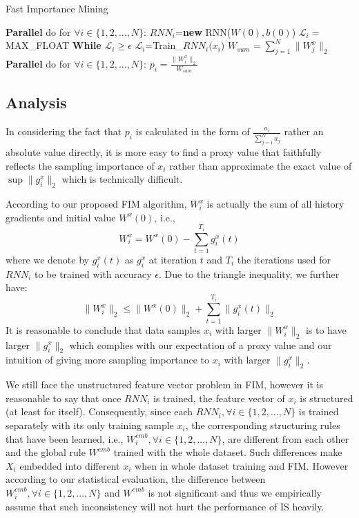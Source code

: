 \documentclass[twoside,leqno,twocolumn]{article}
\begin{document}
\begin{algorithm}[t]
	\caption{Fast Importance Mining}
	\begin{algorithmic}[1]
		\State \textbf{Parallel} do for $\forall i \in \{1,2,...,N\}$:
		\State \qquad $RNN_i$=\textbf{new} RNN($W(0),b(0)$)
		\State \qquad $\mathcal{L}_i =$ MAX\_FLOAT
		\State \qquad \textbf{While} $\mathcal{L}_i\ge \epsilon$
		\State \qquad \qquad $\mathcal{L}_i$=Train\_$RNN_i$$(x_i$)
		\State $W_{sum} = \sum_{j=1}^{N}\|W^x_j\|_2$
		\State \textbf{Parallel} do for $\forall i \in \{1,2,...,N\}$:
		\State \qquad $p_i=\frac{\|W^x_i\|_2}{W_{sum}}$
		\EndProcedure
	\end{algorithmic}
\label{xx}
\end{algorithm}
\subsection{Analysis}
In considering the fact that $p_i$ is calculated in the form of $\frac{a_i}{\sum_{j=1}^{N}a_j}$ rather an absolute value directly, it is more easy to find a proxy value that faithfully reflects the sampling importance of $x_i$ rather than approximate the exact value of $\sup \|g_i^x\|_2$ which is technically difficult. 

According to our proposed FIM algorithm, $W^x_i$ is actually the sum of all history gradients and initial value $W^x(0)$, i.e.,
\begin{equation}
W^x_i=W^x(0)-\sum_{t=1}^{T_i}g_i^x(t)
\end{equation}
where we denote by $g_i^x(t)$ as $g_i^x$ at iteration $t$ and $T_i$ the iterations used for $RNN_i$ to be trained with accuracy $\epsilon$. Due to the triangle inequality, we further have:
\begin{equation}
	\|W^x_i\|_2\le\|W^x(0)\|_2 + \sum_{t=1}^{T_i}\|g_i^x(t)\|_2
\end{equation}
It is reasonable to conclude that data samples $x_i$ with larger $\|W_i^x\|_2$ is to have larger $\|g_i^x\|_2$ which complies with our expectation of a proxy value and our intuition of giving more sampling importance to $x_i$ with larger $\|g_i^x\|_2$. 
 
We still face the unstructured feature vector problem in FIM, however it is reasonable to say that once $RNN_i$ is trained, the feature vector of $x_i$ is structured (at least for itself). Consequently, since each $RNN_i, \forall i \in \{1,2,...,N\}$ is trained separately with its only training sample $x_i$, the corresponding structuring rules that have been learned, i.e., $W^{emb}_i, \forall i \in \{1,2,...,N\}$, are different from each other and the global rule $W^{emb}$ trained with the whole dataset. Such differences make $X_i$ embedded into different $x_i$ when in whole dataset training and FIM. However according to our statistical evaluation, the difference between $W^{emb}_i, \forall i \in \{1,2,...,N\}$ and $W^{emb}$ is not significant and thus we empirically assume that such inconsistency will not hurt the performance of IS heavily.
\end{document}
